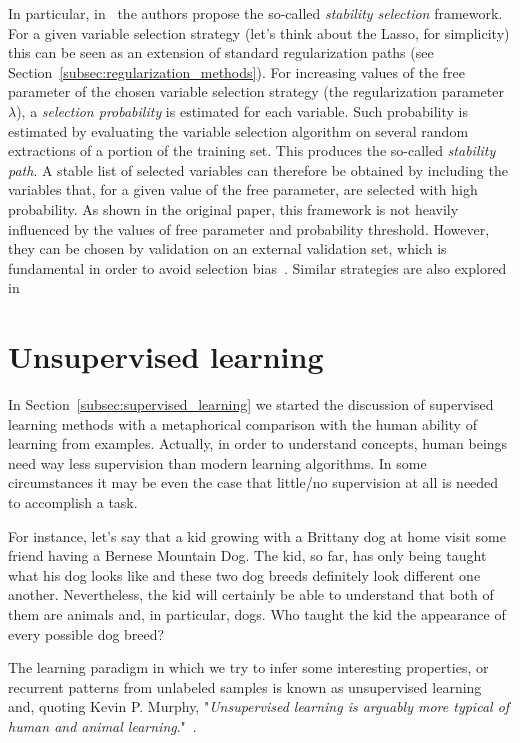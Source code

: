 	In particular, in~\cite{meinshausen2010stability} the authors propose the so-called \textit{stability selection} framework.
	For a given variable selection strategy (let's think about the Lasso, for simplicity) this can be seen as an extension of standard regularization paths (see Section~\ref{subsec:regularization_methods}). For increasing values of the free parameter of the chosen variable selection strategy (\eg the regularization parameter $\lambda$), a \textit{selection probability} is estimated for each variable. Such probability is estimated by evaluating the variable selection algorithm on several random extractions of a portion of the training set. This produces the so-called \textit{stability path}.
	A stable list of selected variables can therefore be obtained by including the variables that, for a given value of the free parameter, are selected with high probability.
	As shown in the original paper, this framework is not heavily influenced by the values of free parameter and probability threshold. However, they can be chosen by validation on an external validation set, which is fundamental in order to avoid selection bias~\cite{ambroise2002selection}. Similar strategies are also explored in~\cite{de2009regularized, barbieri16palladio}
	

  \section{Unsupervised learning} \label{subsec:unsupervised_learning}
  In Section~\ref{subsec:supervised_learning} we started the discussion of supervised learning methods with a metaphorical comparison with the human ability of learning from examples.
  Actually, in order to understand concepts, human beings need way less supervision than modern learning algorithms.
  In some circumstances it may be even the case that little/no supervision at all is needed to accomplish a task.

  For instance, let's say that a kid growing with a Brittany dog at home visit some friend having a Bernese Mountain Dog.
  The kid, so far, has only being taught what his dog looks like and these two dog breeds definitely look different one another.
  Nevertheless, the kid will certainly be able to understand that both of them are animals and, in particular, dogs.
  Who taught the kid the appearance of every possible dog breed?
  
  The learning paradigm in which we try to infer some interesting properties, or recurrent patterns from unlabeled samples is known as unsupervised learning and,
  quoting Kevin P. Murphy, "\textit{Unsupervised learning is arguably more typical of human and animal learning}."~\cite{murphy2012machine}.
  

